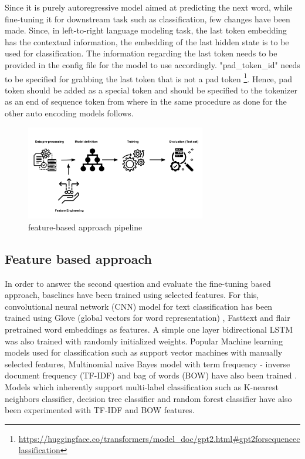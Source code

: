 Since it is purely autoregressive model aimed at predicting the next word, while fine-tuning it for downstream task such as classification, few changes have been made. Since, in left-to-right language modeling task, the last token embedding has the contextual information, the embedding of the last hidden state is to be used for classification. The information regarding the last token needs to be provided in the config file for the model to use accordingly. "pad\_token\_id" needs to be specified for grabbing the last token that is not a pad token \footnote{\url{https://huggingface.co/transformers/model_doc/gpt2.html#gpt2forsequenceclassification}}. Hence, pad token should be added as a special token and should be specified to the tokenizer as an end of sequence token from where in the same procedure as done for the other auto encoding models follows.

\begin{figure}[]
    \centering
    \includegraphics[width=0.7\textwidth]{thesis/figures/Baseline_pipeline (2).png}
    \caption{feature-based approach pipeline}
    \label{fig:feature-based approach pipeline}
\end{figure}

\subsection{Feature based approach}
In order to answer the second question and evaluate the fine-tuning based approach, baselines have been trained using selected features. For this, convolutional neural network (CNN) model for text classification has been trained using Glove (global vectors for word representation) \cite{pennington2014glove}, Fasttext  \cite{joulin2017bag} and flair  \cite{akbik2019flair} pretrained word embeddings as features. A simple one layer bidirectional LSTM was also trained  with randomly initialized weights. Popular Machine learning models used for classification such as support vector machines with manually selected features, Multinomial naive Bayes model with term frequency - inverse document frequency (TF-IDF) and bag of words (BOW) have also been trained \cite{kowsari2019text}. Models which inherently support multi-label classification such as K-nearest neighbors classifier, decision tree classifier and random forest classifier have also been experimented with TF-IDF and BOW features.


